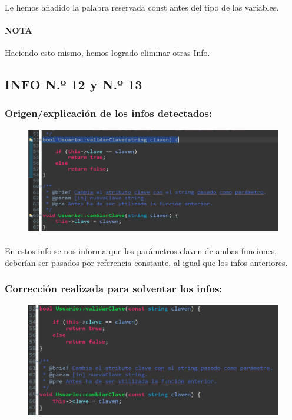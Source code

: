 			\paragraph{}Le hemos añadido la palabra reservada const antes del tipo de las variables.
			
			\paragraph{NOTA}Haciendo esto mismo, hemos logrado eliminar otras Info.	
			
	\subsection{INFO N.º 12 y N.º 13}
	
		\subsubsection{Origen/explicación de los infos detectados:}
		
			\begin{figure}[H]
				\centering
				\includegraphics[scale=0.55]{img/esteban18.png}
				\label{esteban18}
			\end{figure}
		
			\paragraph{}En estos info se nos informa que los parámetros claven de ambas funciones, deberían ser pasados por referencia constante, al igual que los infos anteriores.
			
		\subsubsection{Corrección realizada para solventar los infos:}
		
			\begin{figure}[H]
				\centering
				\includegraphics[scale=0.55]{img/esteban19.png}
				\label{esteban19}
			\end{figure}
		

